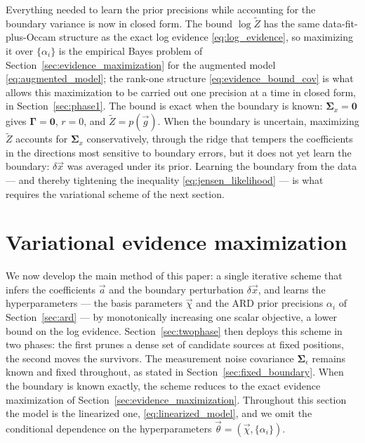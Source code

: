 \documentclass{article}
\begin{document}
Everything needed to learn the prior precisions while accounting for the boundary variance is now in closed form. The bound $\log\tilde Z$ has the same data-fit-plus-Occam structure as the exact log evidence \eqref{eq:log_evidence}, so maximizing it over $\{\alpha_i\}$ is the empirical Bayes problem of Section~\ref{sec:evidence_maximization} for the augmented model \eqref{eq:augmented_model}; the rank-one structure \eqref{eq:evidence_bound_cov} is what allows this maximization to be carried out one precision at a time in closed form, in Section~\ref{sec:phase1}. The bound is exact when the boundary is known: $\mathbf{\Sigma}_x = \mathbf 0$ gives $\mathbf\Gamma = \mathbf 0$, $r = 0$, and $\tilde Z = p(\vec g)$. When the boundary is uncertain, maximizing $\tilde Z$ accounts for $\mathbf{\Sigma}_x$ conservatively, through the ridge that tempers the coefficients in the directions most sensitive to boundary errors, but it does not yet learn the boundary: $\delta\vec x$ was averaged under its prior. Learning the boundary from the data --- and thereby tightening the inequality \eqref{eq:jensen_likelihood} --- is what requires the variational scheme of the next section.

\section{Variational evidence maximization} \label{sec:vbem}
We now develop the main method of this paper: a single iterative scheme that infers the coefficients $\vec a$ and the boundary perturbation $\delta\vec x$, and learns the hyperparameters --- the basis parameters $\vec\chi$ and the ARD prior precisions $\alpha_i$ of Section~\ref{sec:ard} --- by monotonically increasing one scalar objective, a lower bound on the log evidence. Section~\ref{sec:twophase} then deploys this scheme in two phases: the first prunes a dense set of candidate sources at fixed positions, the second moves the survivors. The measurement noise covariance $\mathbf{\Sigma}_\epsilon$ remains known and fixed throughout, as stated in Section~\ref{sec:fixed_boundary}. When the boundary is known exactly, the scheme reduces to the exact evidence maximization of Section~\ref{sec:evidence_maximization}. Throughout this section the model is the linearized one, \eqref{eq:linearized_model}, and we omit the conditional dependence on the hyperparameters $\vec\theta = (\vec\chi, \{\alpha_i\})$.
\end{document}

